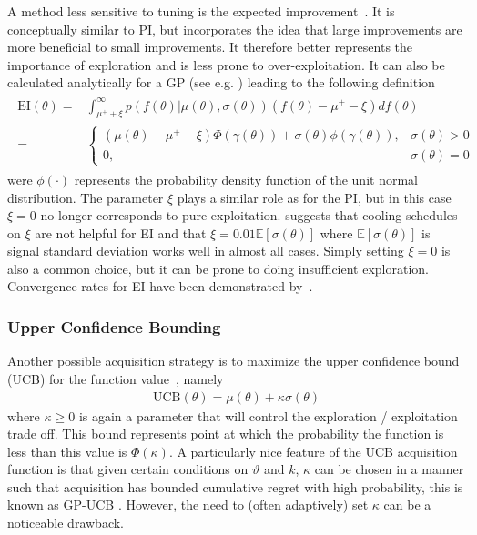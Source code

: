 A method less sensitive to tuning is the expected improvement~\citep{movckus1975bayesian}.  
It is conceptually similar to PI, but incorporates the idea that large improvements are more beneficial
to small improvements. It therefore better represents the importance of exploration and
is less prone to over-exploitation.
It can also be calculated analytically for a GP (see e.g. \cite{brochu2010tutorial}) leading to
the following definition
\begin{align}
\label{eq:opt:EI}
\begin{split}
\mathrm{EI} \left(\theta\right) = & \int_{\mu^+ +\xi}^{\infty} p\left(f\left(\theta\right)|\mu\left(\theta\right),\sigma\left(\theta\right)\right) \left(f\left(\theta\right)-\mu^+-\xi\right) df\left(\theta\right) \\
= & \begin{cases}
\left(\mu\left(\theta\right)-\mu^+-\xi\right)\Phi \left(\gamma\left(\theta\right)\right)+\sigma\left(\theta\right)\phi\left(\gamma\left(\theta\right)\right), & \sigma \left(\theta\right) > 0 \\
0, & \sigma \left(\theta\right) = 0
\end{cases}
\end{split}
\end{align}
were $\phi \left(\cdot\right)$ represents the probability density function of the unit normal distribution.  
The parameter $\xi$ plays a similar role as for the PI, but in this case $\xi=0$ no longer corresponds 
to pure exploitation.  \cite{lizotte2008practical} suggests that cooling schedules on $\xi$ are 
not helpful for EI and that $\xi = 0.01 \mathbb{E} \left[\sigma \left(\theta\right)\right]$ where 
$\mathbb{E} \left[\sigma \left(\theta\right)\right]$ is signal standard deviation works well in almost all cases.
Simply setting $\xi=0$ is also a common choice, but it can be prone to doing insufficient exploration.
Convergence rates for EI have been demonstrated by~\cite{bull2011convergence}.

\subsubsection{Upper Confidence Bounding}
\label{sec:opt:BO:acq:ucb}

Another possible acquisition strategy is to maximize the upper confidence bound (UCB) for
the function value~\citep{lai1985asymptotically,srinivas2009gaussian}, namely
\begin{align}
\label{eq:UCB}
\mathrm{UCB}\left(\theta\right) = \mu \left(\theta\right) + \kappa \sigma \left(\theta\right)
\end{align}
where $\kappa \ge 0$ is again a parameter that will control the exploration / exploitation trade off.
This bound represents point at which the probability the function is less than this value is $\Phi (\kappa)$.
A particularly nice feature of the UCB acquisition function is that given certain conditions on 
$\vartheta$ and $k$, $\kappa$ can be chosen in a manner such that acquisition has bounded 
cumulative regret with high probability, this is known as GP-UCB \citep{srinivas2009gaussian}. 
However, the need to (often adaptively) set $\kappa$ can be a noticeable drawback.

